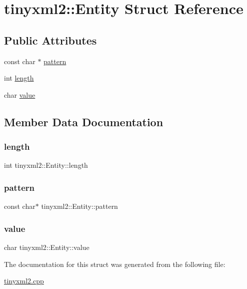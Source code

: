 \hypertarget{structtinyxml2_1_1_entity}{}\section{tinyxml2\+:\+:Entity Struct Reference}
\label{structtinyxml2_1_1_entity}
\subsection*{Public Attributes}
\begin{DoxyCompactItemize}
\item 
const char $\ast$ \mbox{\hyperlink{structtinyxml2_1_1_entity_ab330f5d665d29bfc811ecfa76315894b}{pattern}}
\item 
int \mbox{\hyperlink{structtinyxml2_1_1_entity_a25e2b57cb59cb4fa68f283d7cb570f21}{length}}
\item 
char \mbox{\hyperlink{structtinyxml2_1_1_entity_a7334e81e33b4615655a403711b24f3ed}{value}}
\end{DoxyCompactItemize}


\subsection{Member Data Documentation}
\mbox{\label{structtinyxml2_1_1_entity_a25e2b57cb59cb4fa68f283d7cb570f21}} 
\subsubsection{\texorpdfstring{length}{length}}
{\footnotesize\ttfamily int tinyxml2\+::\+Entity\+::length}

\mbox{\label{structtinyxml2_1_1_entity_ab330f5d665d29bfc811ecfa76315894b}} 
\subsubsection{\texorpdfstring{pattern}{pattern}}
{\footnotesize\ttfamily const char$\ast$ tinyxml2\+::\+Entity\+::pattern}

\mbox{\label{structtinyxml2_1_1_entity_a7334e81e33b4615655a403711b24f3ed}} 
\subsubsection{\texorpdfstring{value}{value}}
{\footnotesize\ttfamily char tinyxml2\+::\+Entity\+::value}



The documentation for this struct was generated from the following file\+:\begin{DoxyCompactItemize}
\item 
\mbox{\hyperlink{tinyxml2_8cpp}{tinyxml2.\+cpp}}\end{DoxyCompactItemize}
